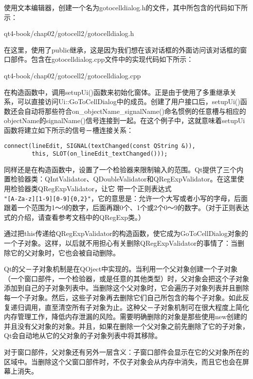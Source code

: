 \documentclass[11pt,oneside]{book}
\begin{document}
\begin{common-format}
使用文本编辑器，创建一个名为gotocelldialog.h的文件，其中所包含的代码如下所示：
\begin{cppinput}{qt4-book/chap02/gotocell2/gotocelldialog.h}
\end{cppinput}


在这里，使用了public继承，这是因为我们想在该对话框的外面访问该对话框的窗口部件。包含在gotocelldialog.cpp文件中的实现代码如下所示：
\begin{cppinput}{qt4-book/chap02/gotocell2/gotocelldialog.cpp}
\end{cppinput}

在构造函数中，调用setupUi()函数来初始化窗体。正是由于使用了多重继承关系，可以直接访问Ui::GoToCellDialog中的成员。创建了用户接口后，setupUi()函数还会自动将那些符合on\_{}objectName\_{}signalName()命名惯例的任意槽与相应的objectName的signalName()信号连接到一起。在这个例子中，这就意味着setupUi函数将建立如下所示的信号－槽连接关系：
\begin{Verbatim}
connect(lineEdit, SIGNAL(textChanged(const QString &)),
        this, SLOT(on_lineEdit_textChanged()));
\end{Verbatim}

同样还是在构造函数中，设置了一个检验器来限制输入的范围。Qt提供了三个内置检验器类：QIntValidator、QDoubleValidator和QRegExpValidator。在这里使用检验器类QRegExpValidator，让它
带一个正则表达式\\ \verb+"[A-Za-z][1-9][0-9]{0,2}"+，它的意思是：允许一个大写或者小写的字母，后面
跟着一个范围为1～9的数字，后面再跟0个、1个或2个0～9的数字。（对于正则表达式的介绍，请查看参考文档中的QRegExp类。）

通过把this传递给QRegExpValidator的构造函数，使它成为GoToCellDialog对象的一个子对象。这样，以后就不用担心有关删除QRegExpValidator的事情了：当删除它的父对象时，它也会被自动删除。

Qt的父－子对象机制是在QOject中实现的。当利用一个父对象创建一个子对象（一个窗口部件，一个检验器，或是任意的其他类型）时，父对象会把这个子对象添加到自己的子对象列表中。当删除这个父对象时，它会遍历子对象列表并且删除每一个子对象。然后，这些子对象再去删除它们自己所包含的每个子对象。如此反复递归调用，直至清空所有子对象为止。这种父－子对象机制可在很大程度上简化内存管理工作，降低内存泄漏的风险。需要明确删除的对象是那些使用new创建的并且没有父对象的对象。并且，如果在删除一个父对象之前先删除了它的子对象，Qt会自动地从它的父对象的子对象列表中将其移除。

对于窗口部件，父对象还有另外一层含义：子窗口部件会显示在它的父对象所在的区域中。当删除这个父窗口部件时，不仅子对象会从内存中消失，而且它也会在屏幕上消失。


\end{common-format}
\end{document}
